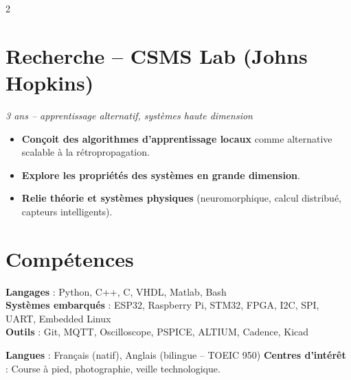 \documentclass[10pt,a4paper]{article}
\begin{document}
\begin{multicols}{2}
\section*{Recherche – CSMS Lab (Johns Hopkins)}
\textit{3 ans – apprentissage alternatif, systèmes haute dimension}
\begin{itemize}[leftmargin=*]
    \item \textbf{Conçoit des algorithmes d’apprentissage locaux} comme alternative scalable à la rétropropagation.
    \item \textbf{Explore les propriétés des systèmes en grande dimension}.
    \item \textbf{Relie théorie et systèmes physiques} (neuromorphique, calcul distribué, capteurs intelligents).
\end{itemize}

\end{multicols}

\vspace{0.1cm}
\section*{Compétences}
\textbf{Langages} : Python, C++, C, VHDL, Matlab, Bash \\
\textbf{Systèmes embarqués} : ESP32, Raspberry Pi, STM32, FPGA, I2C, SPI, UART, Embedded Linux \\
\textbf{Outils} : Git, MQTT, Oscilloscope, PSPICE, ALTIUM, Cadence, Kicad
\vspace{0.2cm}

\noindent
\textbf{Langues} : Français (natif), Anglais (bilingue – TOEIC 950) \hfill
\textbf{Centres d’intérêt} : Course à pied, photographie, veille technologique.
\end{document}
